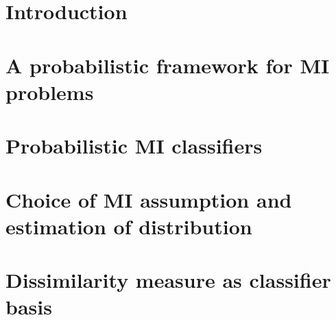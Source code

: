 \documentclass[preprint,12pt]{elsarticle}
\begin{document}
\newcommand{\cpos}{\text{\scriptsize{{\it POS}}}}
\newcommand{\cneg}{\text{\scriptsize{{\it NEG}}}}


\begin{frontmatter}







\end{frontmatter}

\clearpage

\section{Introduction} \label{sec:Introduction} 


\section{A probabilistic framework for MI problems} \label{sec:Probabilistic} 


% 

% 

\section{Probabilistic MI classifiers} \label{sec:Classifier}


\section{Choice of MI assumption and estimation of distribution} \label{sec:Distribution}


\section{Dissimilarity measure as classifier basis} \label{sec:Dissimilarity}

\end{document}
